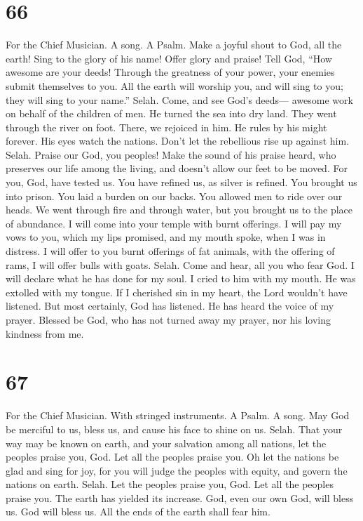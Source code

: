 \hypertarget{section-65}{%
\section{66}\label{section-65}}

For the Chief Musician. A song. A Psalm.  Make a joyful
shout to God, all the earth!  Sing to the glory of his
name! Offer glory and praise!  Tell God, ``How awesome are
your deeds! Through the greatness of your power, your enemies submit
themselves to you.  All the earth will worship you, and
will sing to you; they will sing to your name.'' Selah. 
Come, and see God's deeds--- awesome work on behalf of the children of
men.  He turned the sea into dry land. They went through
the river on foot. There, we rejoiced in him.  He rules by
his might forever. His eyes watch the nations. Don't let the rebellious
rise up against him. Selah.  Praise our God, you peoples!
Make the sound of his praise heard,  who preserves our
life among the living, and doesn't allow our feet to be moved.
 For you, God, have tested us. You have refined us, as
silver is refined.  You brought us into prison. You laid
a burden on our backs.  You allowed men to ride over our
heads. We went through fire and through water, but you brought us to the
place of abundance.  I will come into your temple with
burnt offerings. I will pay my vows to you,  which my
lips promised, and my mouth spoke, when I was in distress.
 I will offer to you burnt offerings of fat animals, with
the offering of rams, I will offer bulls with goats. Selah.
 Come and hear, all you who fear God. I will declare what
he has done for my soul.  I cried to him with my mouth.
He was extolled with my tongue.  If I cherished sin in my
heart, the Lord wouldn't have listened.  But most
certainly, God has listened. He has heard the voice of my prayer.
 Blessed be God, who has not turned away my prayer, nor
his loving kindness from me.

\hypertarget{section-66}{%
\section{67}\label{section-66}}

For the Chief Musician. With stringed instruments. A Psalm. A song.
 May God be merciful to us, bless us, and cause his face
to shine on us. Selah.  That your way may be known on
earth, and your salvation among all nations,  let the
peoples praise you, God. Let all the peoples praise you. 
Oh let the nations be glad and sing for joy, for you will judge the
peoples with equity, and govern the nations on earth. Selah.
 Let the peoples praise you, God. Let all the peoples
praise you.  The earth has yielded its increase. God, even
our own God, will bless us.  God will bless us. All the
ends of the earth shall fear him.

